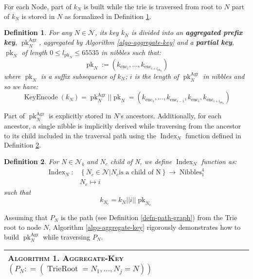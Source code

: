 \documentclass{book}
\newcommand{\assign}{:=}
\newcommand{\tmname}[1]{\textsc{#1}}
\newcommand{\tmop}[1]{\ensuremath{\operatorname{#1}}}
\newcommand{\tmstrong}[1]{\textbf{#1}}
\newcommand{\tmtextbf}[1]{{\bfseries{#1}}}
\newcommand{\tmtextsc}[1]{{\scshape{#1}}}
\newcounter{tmcounter}
\newcommand{\custombinding}[1]{%
  \setcounter{tmcounter}{#1}%
  \addtocounter{tmcounter}{-1}%
  \refstepcounter{tmcounter}}
\newtheorem{definition}{Definition}
\providecommand{\tmname}[1]{\tmtextsc{#1}}
\providecommand{\tmop}[1]{\ensuremath{\mathrm{#1}}}
\providecommand{\tmstrong}[1]{\tmtextbf{#1}}
\providecommand{\tmtextbf}[1]{\tmtextbf{#1}}
\newtheorem{definition}{Definition}
\begin{document}
For each Node, part of $k_N$ is built while the trie is traversed from root to
$N$ part of $k_N$ is stored in $N$ as formalized in Definition
\ref{defn-node-key}.

\begin{definition}
  \label{defn-node-key}For any $N \in \mathcal{N}$, its key $k_N$ is divided
  into an {\tmstrong{aggregated prefix key}},
  {\tmstrong{$\tmop{pk}_N^{\tmop{Agr}}$}}, aggregated by Algorithm
  \ref{algo-aggregate-key} and a {\tmstrong{partial key}},
  {\tmstrong{$\tmop{pk}_N$}} of length $0 \leqslant l_{\tmop{pk}_N} \leqslant
  65535$ in nibbles such that:
  \[ \tmop{pk}_N \assign (k_{\tmop{enc}_i}, \ldots, k_{\tmop{enc}_{i +
     l_{\tmop{pk}_N}}}) \]
  where $\tmop{pk}_N$ is a suffix subsequence of $k_N$; $i$ is the length of
  $\tmop{pk}_N^{\tmop{Agr}}$ in nibbles and so we have:
  \[ \tmop{KeyEncode} (k_N) = \tmop{pk}_N^{\tmop{Agr}} | | \tmop{pk}_N =
     (k_{\tmop{enc}_1}, \ldots, k_{\tmop{enc}_{i - 1}}, k_{\tmop{enc}_i},
     k_{\tmop{enc}_{i + l_{\tmop{pk}_N}}}) \]
\end{definition}

Part of $\tmop{pk}_N^{\tmop{Agr}}$ is explicitly stored in $N$'s ancestors.
Additionally, for each ancestor, a single nibble is implicitly derived while
traversing from the ancestor to its child included in the traversal path using
the $\tmop{Index}_N$ function defined in Definition \ref{defn-index-function}.

\begin{definition}
  \label{defn-index-function}For $N \in \mathcal{N}_b$ and $N_c$ child of N,
  we define {\tmstrong{$\tmop{Index}_N$}} function as:
  \[ \begin{array}{cc}
       \tmop{Index}_N : & \left\{ N_c \in \mathcal{N}|N_c  \text{is a child of
       N} \right\} \rightarrow \tmop{Nibbles}^4_1\\
       & N_c \mapsto i_{}
     \end{array} \]
  such that
  \[ k_{N_c} = k_N | | i | | \tmop{pk}_{N_c} \]
\end{definition}

Assuming that $P_N$ is the path (see Definition \ref{defn-path-graph}) from
the Trie root to node $N$, Algorithm \ref{algo-aggregate-key} rigorously
demonstrates how to build $\tmop{pk}^{\tmop{Agr}}_N$ while traversing $P_N$.

\custombinding{1}{\noindent}\begin{tabular}{l}
  \hline
  \tmtextsc{Algorithm  1. }
  \label{algo-aggregate-key}{\tmname{Aggregate-Key}}$(P_N : = (\tmop{TrieRoot}
  = N_1, \ldots, N_j = N))$\\
  \hline
\end{tabular}
\end{document}
